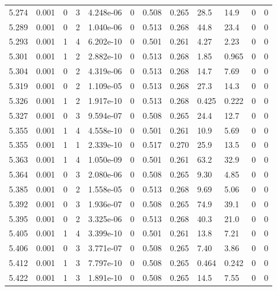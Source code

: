 \documentclass[preview]{standalone}
\begin{document}
{{{{{{{{{{{{{{\begin{tabular}{L{1.2cm}C{1.2cm} C{0.3cm}C{0.5cm} C{1.4cm}C{1.4cm} C{1.4cm}C{1.4cm} C{1.6cm}C{1.6cm} C{1.6cm}C{1.6cm}}
  5.274  &  0.001  & 0     &  3 &  4.248e-06  & 0  &  0.508&   0.265& 28.5 & 14.9   &  0 & 0  \\ 
  5.289  &  0.001  & 0     &  2 &  1.040e-06  & 0  &  0.513&   0.268& 44.8 & 23.4   &  0 & 0  \\ 
  5.293  &  0.001  & 1     &  4 &  6.202e-10  & 0  &  0.501&   0.261& 4.27 & 2.23   &  0 & 0  \\ 
  5.301  &  0.001  & 1     &  2 &  2.882e-10  & 0  &  0.513&   0.268& 1.85 & 0.965   &  0 & 0  \\ 
  5.304  &  0.001  & 0     &  2 &  4.319e-06  & 0  &  0.513&   0.268& 14.7 & 7.69   &  0 & 0  \\ 
  5.319  &  0.001  & 0     &  2 &  1.109e-05  & 0  &  0.513&   0.268& 27.3 & 14.3   &  0 & 0  \\ 
  5.326  &  0.001  & 1     &  2 &  1.917e-10  & 0  &  0.513&   0.268& 0.425 & 0.222   &  0 & 0  \\ 
  5.327  &  0.001  & 0     &  3 &  9.594e-07  & 0  &  0.508&   0.265& 24.4 & 12.7   &  0 & 0  \\ 
  5.355  &  0.001  & 1     &  4 &  4.558e-10  & 0  &  0.501&   0.261& 10.9 & 5.69   &  0 & 0  \\ 
  5.355  &  0.001  & 1     &  1 &  2.339e-10  & 0  &  0.517&   0.270& 25.9 & 13.5   &  0 & 0  \\ 
  5.363  &  0.001  & 1     &  4 &  1.050e-09  & 0  &  0.501&   0.261& 63.2 & 32.9   &  0 & 0  \\ 
  5.364  &  0.001  & 0     &  3 &  2.080e-06  & 0  &  0.508&   0.265& 9.30 & 4.85   &  0 & 0  \\ 
  5.385  &  0.001  & 0     &  2 &  1.558e-05  & 0  &  0.513&   0.268& 9.69 & 5.06   &  0 & 0  \\ 
  5.392  &  0.001  & 0     &  3 &  1.936e-07  & 0  &  0.508&   0.265& 74.9 & 39.1   &  0 & 0  \\ 
  5.395  &  0.001  & 0     &  2 &  3.325e-06  & 0  &  0.513&   0.268& 40.3 & 21.0   &  0 & 0  \\ 
  5.405  &  0.001  & 1     &  4 &  3.399e-10  & 0  &  0.501&   0.261& 13.8 & 7.21   &  0 & 0  \\ 
  5.406  &  0.001  & 0     &  3 &  3.771e-07  & 0  &  0.508&   0.265& 7.40 & 3.86   &  0 & 0  \\ 
  5.412  &  0.001  & 1     &  3 &  7.797e-10  & 0  &  0.508&   0.265& 0.464 & 0.242   &  0 & 0  \\ 
  5.422  &  0.001  & 1     &  3 &  1.891e-10  & 0  &  0.508&   0.265& 14.5 & 7.55   &  0 & 0  \\ 

\end{tabular}}}}}}}}}}}}}}}
\end{document}
